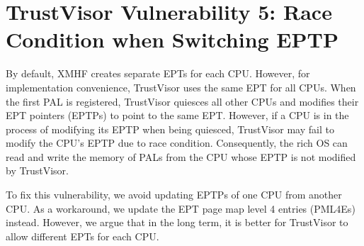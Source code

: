 \section{TrustVisor Vulnerability 5: Race Condition when Switching EPTP}
\label{sec:vuln_xmhf_tv_race_eptp}

By default, XMHF creates separate EPTs for each CPU. However, for implementation convenience, TrustVisor uses the same EPT for all CPUs. When the first PAL is registered, TrustVisor quiesces all other CPUs and modifies their EPT pointers (EPTPs) to point to the same EPT. However, if a CPU is in the process of modifying its EPTP when being quiesced, TrustVisor may fail to modify the CPU's EPTP due to race condition. Consequently, the rich OS can read and write the memory of PALs from the CPU whose EPTP is not modified by TrustVisor.

To fix this vulnerability, we avoid updating EPTPs of one CPU from another CPU. As a workaround, we update the EPT page map level 4 entries (PML4Es) instead. However, we argue that in the long term, it is better for TrustVisor to allow different EPTs for each CPU.

